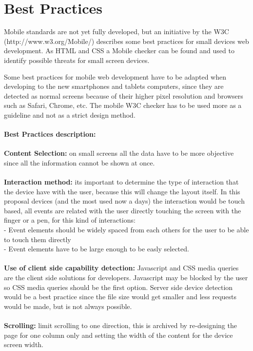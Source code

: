 \section{Best Practices}

Mobile standards are not yet fully developed, but an initiative by the W3C (http://www.w3.org/Mobile/) describes some best practices for small devices web development. As HTML and CSS a Mobile checker can be found and used to identify possible threats for small screen devices.

Some best practices for mobile web development have to be adapted when developing to the new smartphones and tablets computers, since they are detected as normal screens because of their higher pixel resolution and browsers such as Safari, Chrome, etc. The mobile W3C checker has to be used more as a guideline and not as a strict design method.
\\\\
\textbf{Best Practices description:}
\\
\\ \textbf{Content Selection:} on small screens all the data have to be more objective since all the information cannot be shown at once.\\
\\ \textbf{Interaction method:} its important to determine the type of interaction that the device have with the user, because this will change the layout itself. In this proposal devices (and the most used now a days) the interaction would be touch based, all events are related with the user directly touching the screen with the finger or a pen, for this kind of interactions:\\
- Event elements should be widely spaced from each others for the user to be able to touch them directly\\
- Event elements have to be large enough to be easly selected.\\
\\\textbf{Use of client side capability detection:} Javascript and CSS media queries are the client side solutions for developers. Javascript may be blocked by the user so CSS media queries should be the first option. Server side device detection would be a best practice since the file size would get smaller and less requests would be made, but is not always possible.\\
\\\textbf{Scrolling:} limit scrolling to one direction, this is archived by re-designing the page for one column only and setting the width of the content for the device screen width.\\
